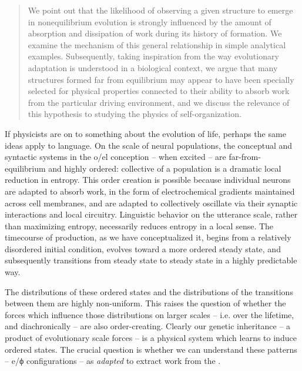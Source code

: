 \begin{quote}
We point out that the likelihood of observing a given structure to emerge in nonequilibrium evolution is strongly influenced by the amount of absorption and dissipation of work during its history of formation. We examine the mechanism of this general relationship in simple analytical examples. Subsequently, taking inspiration from the way evolutionary adaptation is understood in a biological context, we argue that many structures formed far from equilibrium may appear to have been specially selected for physical properties connected to their ability to absorb work from the particular driving environment, and we discuss the relevance of this hypothesis to studying the physics of self-organization. \citep{PerunovEtAl2016}
\end{quote}

  If physicists are on to something about the evolution of life, perhaps the same ideas apply to language. On the scale of neural populations, the conceptual and syntactic systems in the o/el conception -- when excited -- are far-from-equi\-lib\-ri\-um and highly ordered: collective  of a population is a dramatic local reduction in entropy. This order creation is possible because individual neurons are adapted to absorb work, in the form of electrochemical gradients maintained across cell membranes, and are adapted to collectively oscillate via their synaptic interactions and local circuitry. Linguistic behavior on the utterance scale, rather than maximizing entropy, necessarily reduces entropy in a local sense. The timecourse of production, as we have conceptualized it, begins from a relatively disordered initial condition, evolves toward a more ordered steady state, and subsequently transitions from steady state to steady state in a highly predictable way. 

  The distributions of these ordered states and the distributions of the transitions between them are highly non-uniform. This raises the question of whether the forces which influence those distributions on larger scales -- i.e. over the lifetime, and diachronically -- are also order-creating. Clearly our genetic inheritance -- a product of evolutionary scale forces -- is a physical system which learns to induce ordered states. The crucial question is whether we can understand these patterns -- e/ϕ configurations -- as \textit{adapted} to extract work from the .

